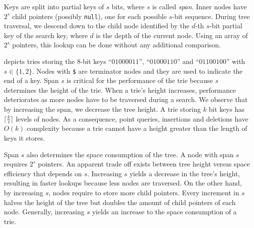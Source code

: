 \documentclass[abstracton,12pt]{scrartcl}
\theoremstyle{definition}
\begin{document}
Keys are split into partial keys of $s$ bits, where $s$ is called 
\textit{span}. Inner nodes have  $2^s$ child pointers 
(possibly \texttt{null}), one for each possible $s$-bit sequence. During tree
traversal, we descend down to the child node identified by the $d$-th
$s$-bit partial key of the search key, where $d$ is the depth of the current 
node.  Using an array of $2^s$  pointers, this lookup can be done without any 
additional comparison. 

 depicts tries storing the 
8-bit keys ``$01000011$'', ``$01000110$'' and ``$01100100$'' with 
$s \in \{1,2\}$. Nodes with \texttt{\$} are terminator nodes and they are used
to indicate the end of a key. Span $s$ is critical for the performance of the 
trie because $s$ determines the height of the trie. When a trie's height
increases, performance deteriorates as more nodes have to be traversed during
a search. We observe that by increasing the span, we decrease the tree height. 
A trie storing $k$ bit keys has $\lceil \frac{k}{s} \rceil$ levels of nodes.
As a consequence, point queries, insertions and deletions have 
$O(k)$ complexity because a trie cannot have a height greater than the length
of keys it stores.

Span $s$ also determines the space consumption of the tree.
A node with span $s$ requires $2^s$ pointers. 
An apparent trade off exists between tree height versus space efficiency that
depends on $s$. Increasing $s$ yields a decrease in the tree's height, 
resulting in faster lookups because less nodes are traversed. On the other
hand, by increasing $s$, nodes require to store more child pointers. Every
increment in $s$ halves the height of the tree but doubles the amount of 
child pointers of each node. Generally, increasing $s$ yields an increase to
the space consumption of a trie.
\end{document}
